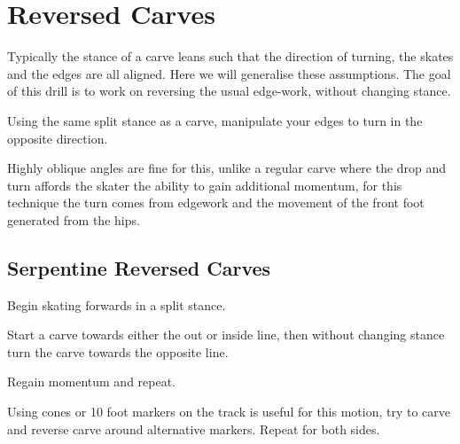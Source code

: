 \section{Reversed Carves}
\label{sec:sticky/reverse_carves}

Typically the stance of a carve leans such that the direction of turning, the skates and the edges are all aligned.    
Here we will generalise these assumptions. 
The goal of this drill is to work on reversing the usual edge-work, without changing stance.


Using the same split stance as a carve, manipulate your edges to turn in the opposite direction. 


Highly oblique angles are fine for this, unlike a regular carve where the drop and turn affords the skater the ability to gain additional momentum, for this technique the turn comes from edgework and the movement of the front foot generated from the hips.


\subsection*{Serpentine Reversed Carves}
\label{drill:sticky/reverse_carves/serpentine}

Begin skating forwards in a split stance.

Start a carve towards either the out or inside line, then without changing stance turn the carve towards the opposite line. 

Regain momentum and repeat.

Using cones or 10 foot markers on the track is useful for this motion, try to carve and reverse carve around alternative markers.
Repeat for both sides.
